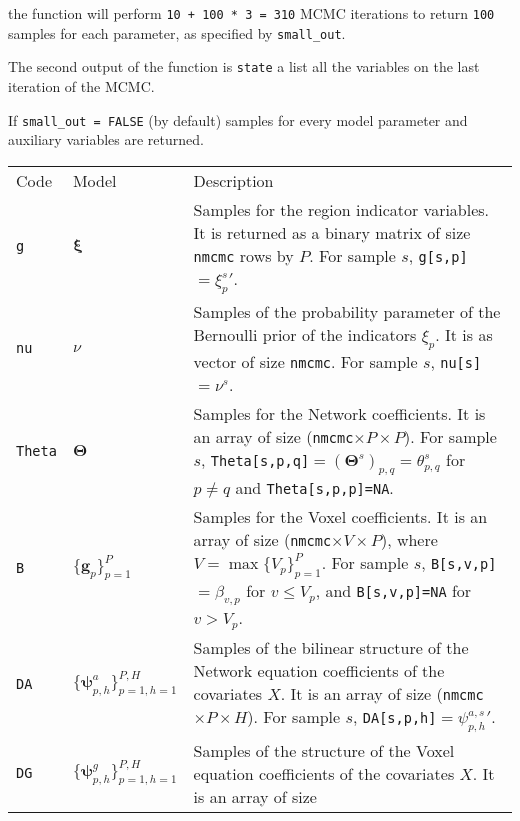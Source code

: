 \documentclass[
]{article}
\begin{document}
the function will perform \texttt{10\ +\ 100\ *\ 3\ =\ 310} MCMC iterations to return \texttt{100}
samples for each parameter, as specified by \texttt{small\_out}.

The second output of the function is \texttt{state} a list all the variables on the
last iteration of the MCMC.

If \texttt{small\_out\ =\ FALSE} (by default) samples for every model parameter and
auxiliary variables are returned.

\begin{longtable}[]{@{}
  >{\raggedleft\arraybackslash}p{}
  >{\centering\arraybackslash}p{}
  >{\raggedright\arraybackslash}p{}@{}}
\toprule\noalign{}
\endhead
\bottomrule\noalign{}
\endlastfoot
Code & Model & Description \\
\texttt{g} & \( {\boldsymbol \xi} \) & Samples for the region indicator variables. It is returned as a binary
matrix of size \texttt{nmcmc} rows by \(P\). For sample \(s\), \texttt{g{[}s,p{]}} \(={\xi_p^s}'\). \\
\texttt{nu} & \(\nu\) & Samples of the probability parameter of the Bernoulli prior of the indicators \(\xi_p\). It is as vector of size \texttt{nmcmc}. For
sample \(s\), \texttt{nu{[}s{]}}\(=\nu^s\). \\
\texttt{Theta} & \( {\boldsymbol \Theta} \) & Samples for the Network coefficients. It is an array of size (\texttt{nmcmc}\(\times P \times P\)). For sample \(s\),
\texttt{Theta{[}s,p,q{]}}\(=( {\boldsymbol \Theta} ^s)_{p,q}=\theta_{p,q}^s\) for \(p\neq q\) and \texttt{Theta{[}s,p,p{]}=NA}. \\
\texttt{B} & \(\{ {\boldsymbol g} _p\}_{p=1}^P\) & Samples for the Voxel coefficients. It is an array of size (\texttt{nmcmc}\(\times V \times P\)), where \(V=\max\{V_p\}_{p=1}^P\).
For sample \(s\), \texttt{B{[}s,v,p{]}}\(=\beta_{v,p}\) for \(v \leq V_p\), and \texttt{B{[}s,v,p{]}=NA} for \(v > V_p\). \\
\texttt{DA} & \(\{ {\boldsymbol \psi} _{p,h}^a\}_{p=1,h=1}^{P,H}\) & Samples of the bilinear structure of the Network equation coefficients of the covariates \(X\). It is an array of size
(\texttt{nmcmc} \(\times P \times H\)). For sample \(s\), \texttt{DA{[}s,p,h{]}}\(= {\psi_{p,h}^{a,s}}'\). \\
\texttt{DG} & \(\{ {\boldsymbol \psi} _{p,h}^g\}_{p=1,h=1}^{P,H}\) & Samples of the structure of the Voxel equation coefficients of the covariates \(X\). It is an array of size

\end{longtable}
\end{document}
